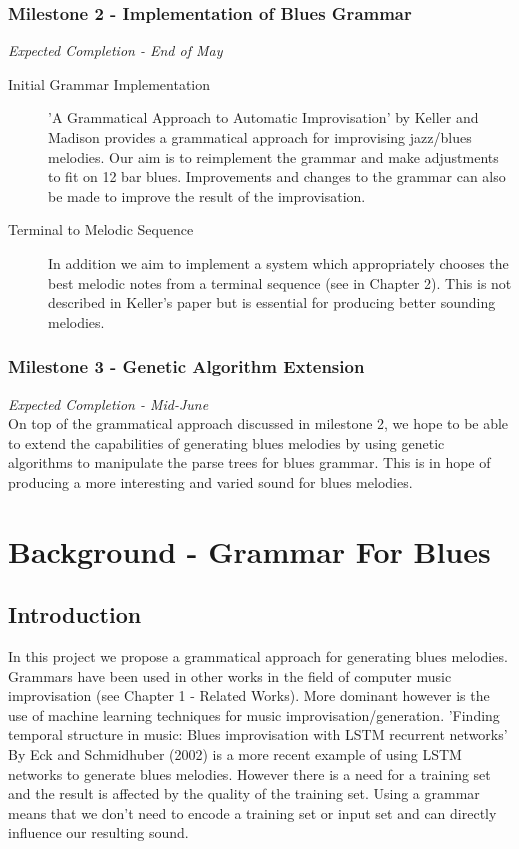 \documentclass[pdftex,12pt,a4paper]{report}
\begin{document}
\subsection{Milestone 2 - Implementation of Blues Grammar}
\emph{Expected Completion - End of May} 
\begin{description}
\item[Initial Grammar Implementation]
'A Grammatical Approach to Automatic Improvisation' by Keller and Madison \cite{keller07} provides a grammatical approach for improvising jazz/blues melodies. Our aim is to reimplement the grammar and make adjustments to fit on 12 bar blues. Improvements and changes to the grammar can also be made to improve the result of the improvisation. 
\item[Terminal to Melodic Sequence]
In addition we aim to implement a system which appropriately chooses the best melodic notes from a terminal sequence (see in Chapter 2). This is not described in Keller's paper but is essential for producing better sounding melodies.
\end{description}

\subsection{Milestone 3 - Genetic Algorithm Extension}
\emph{Expected Completion - Mid-June} \\
On top of the grammatical approach discussed in milestone 2, we hope to be able to extend the capabilities of generating blues melodies by using genetic algorithms to manipulate the parse trees for blues grammar. This is in hope of producing a more interesting and varied sound for blues melodies.


\pagebreak

\chapter{Background - Grammar For Blues}

\section{Introduction}
In this project we propose a grammatical approach for generating blues melodies. Grammars have been used in other works in the field of computer music improvisation (see Chapter 1 - Related Works). More dominant however is the use of machine learning techniques for music improvisation/generation. 'Finding temporal structure in music: Blues improvisation with LSTM recurrent networks' By Eck and Schmidhuber (2002) \cite{eck02} is a more recent example of using LSTM networks to generate blues melodies. However there is a need for a training set and the result is affected by the quality of the training set. Using a grammar means that we don't need to encode a training set or input set and can directly influence our resulting sound.
\end{document}
